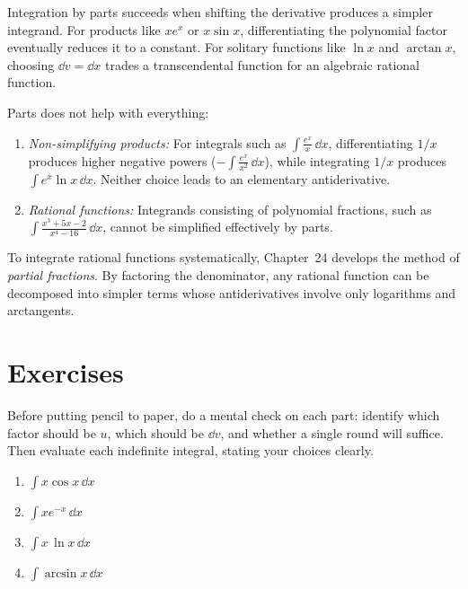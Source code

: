 \begin{connectionbox}
Integration by parts succeeds when shifting the derivative produces a simpler integrand.
For products like $x e^x$ or $x\sin x$, differentiating the polynomial factor eventually
reduces it to a constant. For solitary functions like $\ln x$ and $\arctan x$, choosing
$\dd v = \dd x$ trades a transcendental function for an algebraic rational function.

Parts does not help with everything:
\begin{enumerate}
  \item \emph{Non-simplifying products:} For integrals such as $\int \frac{e^x}{x}\,\dd x$,
  differentiating $1/x$ produces higher negative powers ($-\int \frac{e^x}{x^2}\,\dd x$),
  while integrating $1/x$ produces $\int e^x \ln x\,\dd x$. Neither choice leads to an
  elementary antiderivative.
  \item \emph{Rational functions:} Integrands consisting of polynomial fractions,
  such as $\int \frac{x^3 + 5x - 2}{x^4 - 16}\,\dd x$, cannot be simplified effectively by parts.
\end{enumerate}

To integrate rational functions systematically, Chapter~24 develops the method of
\emph{partial fractions}. By factoring the denominator, any rational function can be
decomposed into simpler terms whose antiderivatives involve only logarithms and arctangents.
\end{connectionbox}

\section*{Exercises}

\begin{exercise}
\label{ch23:exr-warmup}
Before putting pencil to paper, do a mental check on each part: identify which
factor should be $u$, which should be $\dd v$, and whether a single round will
suffice. Then evaluate each indefinite integral, stating your choices clearly.
\begin{enumerate}[label=(\alph*)]
\item $\displaystyle\int x\cos x\,\dd x$
\item $\displaystyle\int x e^{-x}\,\dd x$
\item $\displaystyle\int x\,\ln x\,\dd x$
\item $\displaystyle\int \arcsin x\,\dd x$
\end{enumerate}
\end{exercise}

